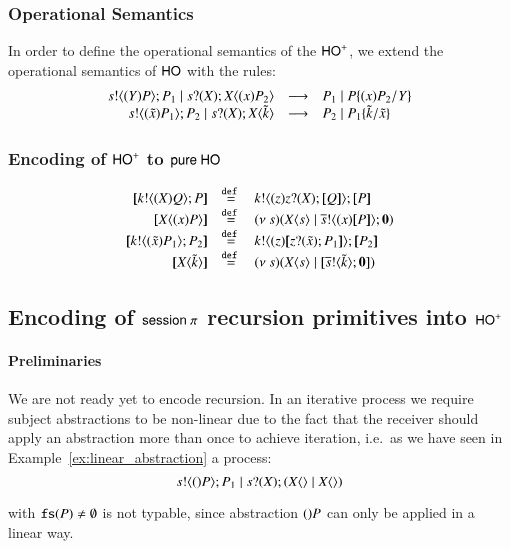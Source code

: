 \subsubsection{Operational Semantics}
In order to define the operational semantics of the $\mathsf{HO}^+$,
we extend the operational semantics of $\mathsf{HO}$ with the rules:
%
\[
	\begin{array}{rcl}
		s ! \langle (Y)P \rangle ; P_1 \;|\; s ? (X) ; X\langle (x)P_2 \rangle &\longrightarrow& P_1 \;|\; P \{(x)P_2/Y \}\\
		s ! \langle (\tilde{x})P_1 \rangle ; P_2 \;|\; s ? (X) ; X\langle \tilde{k} \rangle &\longrightarrow& P_2 \;|\; P_1\{\tilde{k}/\tilde{x} \}
	\end{array}
\]
%
\subsubsection{Encoding of $\mathsf{HO}^+$ to $\mathsf{pure\ HO}$}
%
\[
	\begin{array}{rcl}
		\map{\bout{k}{\abs{\X} Q} P}	&\defeq&	\bout{k}{\abs{z} \binp{z}{\X} \map{Q}} \map{P}\\
		\map{\appl{X}{\abs{x} P}}	&\defeq&	\newsp{s}{\appl{X}{s} \Par \bout{\dual{s}}{\abs{x}{\map{P}}} \inact}\\

		\map{\bout{k}{\abs{\tilde{x}}{P_1}} P_2}	&\defeq&	\bout{k}{ \abs{z}{ \map{ \binp{z}{\tilde{x}} P_1} } } \map{P_2}\\
		\map{\appl{\X}{\tilde{k}}}			&\defeq&	\newsp{s}{\appl{\X}{s} \Par \map{\bout{\dual{s}}{\tilde{k}} \inact}}\\
	\end{array}
\]

\subsection{Encoding of $\mathsf{session\ }\pi$ recursion primitives into $\mathsf{HO}^+$ \label{ss:encrec}}
\paragraph{Preliminaries}
We are not ready yet to encode recursion. In an iterative process we require
subject abstractions to be non-linear due to the fact that the receiver should
apply an abstraction more than once to achieve iteration,
i.e.~as we have seen in Example~\ref{ex:linear_abstraction} a process:
\[
	s ! \langle ()P \rangle ; P_1 \;|\; s ? (X) ; (X\langle  \rangle \;|\; X\langle  \rangle)
\]

with $\mathtt{fs}(P) \not= \emptyset$ is not typable, since abstraction $()P$
can only be applied in a linear way.


